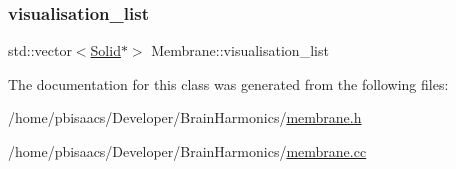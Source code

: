 \mbox{\label{classMembrane_a926d35c07f664b60deb6e9f87649fe89}} 
\subsubsection{\texorpdfstring{visualisation\+\_\+list}{visualisation\_list}}
{\footnotesize\ttfamily std\+::vector$<$\mbox{\hyperlink{classSolid}{Solid}}$\ast$$>$ Membrane\+::visualisation\+\_\+list\hspace{0.3cm}{\ttfamily [protected]}}



The documentation for this class was generated from the following files\+:\begin{DoxyCompactItemize}
\item 
/home/pbisaacs/\+Developer/\+Brain\+Harmonics/\mbox{\hyperlink{membrane_8h}{membrane.\+h}}\item 
/home/pbisaacs/\+Developer/\+Brain\+Harmonics/\mbox{\hyperlink{membrane_8cc}{membrane.\+cc}}\end{DoxyCompactItemize}
